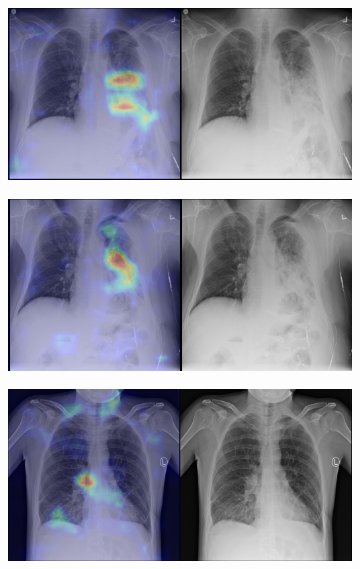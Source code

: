 \begin{figure}[b]
    \centering
    \begin{subfigure}{0.4\textwidth}
        \centering
        \includegraphics[width=1.0\textwidth]{Chapters/5. Conclusiones/img/Consolidation/1_1_00000246_014.png}
    \end{subfigure}
    \begin{subfigure}{0.4\textwidth}
        \centering
        \includegraphics[width=1.0\textwidth]{Chapters/5. Conclusiones/img/Consolidation/1_1_00000246_016.png}
    \end{subfigure}
    \begin{subfigure}{0.4\textwidth}
        \centering
        \includegraphics[width=1.0\textwidth]{Chapters/5. Conclusiones/img/Consolidation/1_1_00000344_000.png}

\end{subfigure}
\end{figure}
